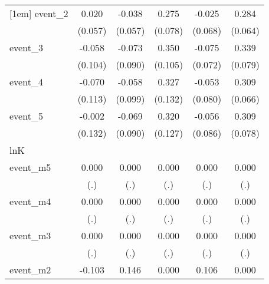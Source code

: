 {\begin{tabular}{l*{5}{c}}
[1em]
event\_2     &       0.020         &      -0.038         &       0.275\sym{***}&      -0.025         &       0.284\sym{***}\\
            &     (0.057)         &     (0.057)         &     (0.078)         &     (0.068)         &     (0.064)         \\
[1em]
event\_3     &      -0.058         &      -0.073         &       0.350\sym{***}&      -0.075         &       0.339\sym{***}\\
            &     (0.104)         &     (0.090)         &     (0.105)         &     (0.072)         &     (0.079)         \\
[1em]
event\_4     &      -0.070         &      -0.058         &       0.327\sym{*}  &      -0.053         &       0.309\sym{***}\\
            &     (0.113)         &     (0.099)         &     (0.132)         &     (0.080)         &     (0.066)         \\
[1em]
event\_5     &      -0.002         &      -0.069         &       0.320\sym{*}  &      -0.056         &       0.309\sym{***}\\
            &     (0.132)         &     (0.090)         &     (0.127)         &     (0.086)         &     (0.078)         \\
\hline
lnK         &                     &                     &                     &                     &                     \\
event\_m5    &       0.000         &       0.000         &       0.000         &       0.000         &       0.000         \\
            &         (.)         &         (.)         &         (.)         &         (.)         &         (.)         \\
[1em]
event\_m4    &       0.000         &       0.000         &       0.000         &       0.000         &       0.000         \\
            &         (.)         &         (.)         &         (.)         &         (.)         &         (.)         \\
[1em]
event\_m3    &       0.000         &       0.000         &       0.000         &       0.000         &       0.000         \\
            &         (.)         &         (.)         &         (.)         &         (.)         &         (.)         \\
[1em]
event\_m2    &      -0.103         &       0.146\sym{*}  &       0.000         &       0.106         &       0.000         \\

\end{tabular}}
